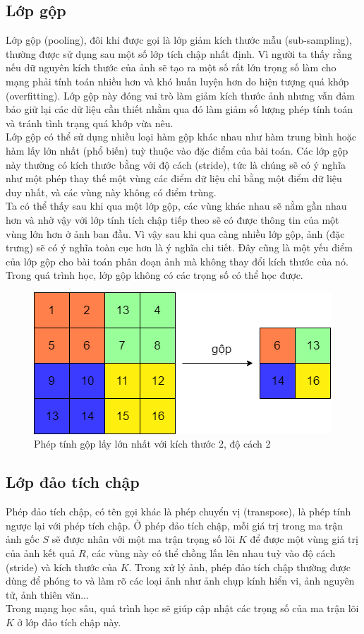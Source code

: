 \subsection{Lớp gộp}
Lớp gộp (pooling), đôi khi được gọi là lớp giảm kích thước mẫu (sub-sampling), thường được sử dụng sau một số lớp tích chập nhất định. Vì người ta thấy rằng nếu dữ nguyên kích thước của ảnh sẽ tạo ra một số rất lớn trọng số làm cho mạng phải tính toán nhiều hơn và khó huấn luyện hơn do hiện tượng quá khớp (overfitting). Lớp gộp này đóng vai trò làm giảm kích thước ảnh nhưng vẫn đảm bảo giữ lại các dữ liệu cần thiết nhằm qua đó làm giảm số lượng phép tính toán và tránh tình trạng quá khớp vừa nêu.\\
Lớp gộp có thể sử dụng nhiều loại hàm gộp khác nhau như hàm trung bình hoặc hàm lấy lớn nhất (phổ biến) tuỳ thuộc vào đặc điểm của bài toán. Các lớp gộp này thường có kích thước bằng với độ cách (stride), tức là chúng sẽ có ý nghĩa như một phép thay thế một vùng các điểm dữ liệu chỉ bằng một điểm dữ liệu duy nhất, và các vùng này không có điểm trùng.\\
Ta có thể thấy sau khi qua một lớp gộp, các vùng khác nhau sẽ nằm gần nhau hơn và nhờ vậy với lớp tính tích chập tiếp theo sẽ có được thông tin của một vùng lớn hơn ở ảnh ban đầu. Vì vậy sau khi qua càng nhiều lớp gộp, ảnh (đặc trưng) sẽ có ý nghĩa toàn cục hơn là ý nghĩa chi tiết. Đây cũng là một yếu điểm của lớp gộp cho bài toán phân đoạn ảnh mà không thay đổi kích thước của nó.\\
Trong quá trình học, lớp gộp không có các trọng số có thể học được.

\begin{figure}[h]
\centering
    \includegraphics[totalheight=3.5cm]{Images/max-pool.png}
    \caption{Phép tính gộp lấy lớn nhất với kích thước 2, độ cách 2}
    \label{poolExample}
\end{figure}

\subsection{Lớp đảo tích chập}
Phép đảo tích chập, có tên gọi khác là phép chuyển vị (transpose), là phép tính ngược lại với phép tích chập. Ở phép đảo tích chập, mỗi giá trị trong ma trận ảnh gốc $S$ sẽ được nhân với một ma trận trọng số lõi $K$ để được một vùng giá trị của ảnh kết quả $R$, các vùng này có thể chồng lấn lên nhau tuỳ vào độ cách (stride) và kích thước của $K$. Trong xử lý ảnh, phép đảo tích chập thường được dùng để phóng to và làm rõ các loại ảnh như ảnh chụp kính hiển vi, ảnh nguyên tử, ảnh thiên văn...\\
Trong mạng học sâu, quá trình học sẽ giúp cập nhật các trọng số của ma trận lõi $K$ ở lớp đảo tích chập này.

